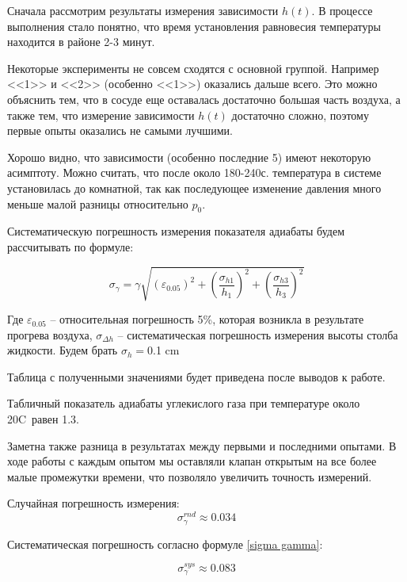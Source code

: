 \documentclass[a4paper,12pt]{report}
\begin{document}
    \begin{multicols}{2}
    Сначала рассмотрим результаты измерения зависимости $h(t)$. В процессе выполнения стало понятно, что время установления равновесия температуры находится в районе 2-3 минут.

    Некоторые эксперименты не совсем сходятся с основной группой. Например <<1>> и <<2>> (особенно <<1>>) оказались дальше всего. Это можно объяснить тем, что в сосуде еще оставалась достаточно большая часть воздуха, а также тем, что измерение зависимости $h(t)$ достаточно сложно, поэтому первые опыты оказались не самыми лучшими.
    
    Хорошо видно, что зависимости (особенно последние 5) имеют некоторую асимптоту. Можно считать, что после около 180-240с. температура в системе установилась до комнатной, так как последующее изменение давления много меньше малой разницы относительно $p_0$.

    Систематическую погрешность измерения показателя адиабаты будем рассчитывать по формуле:

    \begin{equation}
        \label{sigma gamma}
        \sigma_\gamma=\gamma\sqrt{\left(\varepsilon_{0.05}\right)^2+\left(\frac{\sigma_{h1}}{h_1}\right)^2+\left(\frac{\sigma_{{h3}}}{h_3}\right)^2}
    \end{equation}

    Где $\varepsilon_{0.05}$ -- относительная погрешность 5\%, которая возникла в результате прогрева воздуха, $\sigma_{\Delta h}$ -- систематическая погрешность измерения высоты столба жидкости. Будем брать $\sigma_{h}=$0.1 cm

    Таблица с полученными значениями будет приведена после выводов к работе.

    Табличный показатель адиабаты углекислого газа при температуре около 20C\degree \ равен 1.3. 
    
    Заметна также разница в результатах между первыми и последними опытами. В ходе работы с каждым опытом мы оставляли клапан открытым на все более малые промежутки времени, что позволяло увеличить точность измерений.

    Случайная погрешность измерения:
    \begin{equation*}
        \sigma_\gamma^{rnd}\approx0.034
    \end{equation*}

    Систематическая погрешность согласно формуле \eqref{sigma gamma}:

    \begin{equation*}
        \sigma_\gamma^{sys}\approx0.083
    \end{equation*}


\end{multicols}
\end{document}
